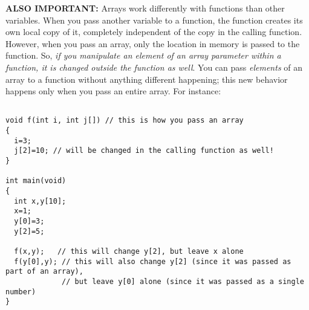 \documentclass[12ampt]{article}
\begin{document}
{\bf ALSO IMPORTANT:} Arrays work differently with functions than other variables. When you pass another variable to a function, the function creates its
own local copy of it, completely independent of the copy in the calling function. However, when you pass an array, only the location in memory is passed
to the function. So, {\it if you manipulate an element of an array parameter within a function, it is changed outside the function as well}. You can pass
{\it elements} of an array to a function without anything different happening; this new behavior happens only when you pass an entire array. For instance:

\begin{verbatim}

void f(int i, int j[]) // this is how you pass an array
{
  i=3;
  j[2]=10; // will be changed in the calling function as well!
}

int main(void)
{
  int x,y[10];
  x=1;
  y[0]=3;
  y[2]=5;

  f(x,y);   // this will change y[2], but leave x alone
  f(y[0],y); // this will also change y[2] (since it was passed as part of an array),
             // but leave y[0] alone (since it was passed as a single number)
}
\end{verbatim}
\end{document}
